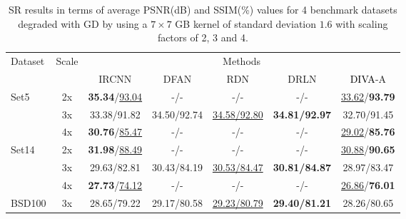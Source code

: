 \documentclass[10pt,journal,compsoc]{IEEEtran}
\newcommand\bdr[1]{{\textbf{#1}}}
\newcommand\bdb[1]{{\underline{#1}}}
\newcommand{\dk}{\textcolor{black}}
\begin{document}
\begin{table}[t!]
\setlength\tabcolsep{1.7pt}

\begin{scriptsize}
\begin{center}
\caption{SR results in terms of average PSNR(dB) and SSIM(\%) values for 4 benchmark datasets degraded with GD by using a $7 \times 7$ GB kernel of standard deviation $1.6$ with scaling factors of 2, 3 and 4.}
\label{tab:tab_psnr_ssim_GausSupReso}
\begin{tabular}{l c ccccc}
\hline

Dataset & Scale & \multicolumn{5}{c}{Methods}\\ 

& & IRCNN\cite{Zhang2017learning} & DFAN\cite{Li2022DFAN} & RDN\cite{Zhang2021residual} & DRLN\cite{Anwar2022densely} & \dk{DIVA}-A \\
\hline


\multirow{3}{*}{Set5}

& 2x & \bdr{35.34}/\bdb{93.04} & -/- & -/- & -/- & \bdb{33.62}/\bdr{93.79} \\

& 3x & 33.38/91.82 & 34.50/92.74 & \bdb{34.58/92.80} & \bdr{34.81/92.97} & 32.70/91.45\\

& 4x &  \bdr{30.76}/\bdb{85.47} & -/- & -/- & -/- & \bdb{29.02}/\bdr{85.76}\\

\hline


\multirow{3}{*}{Set14}

& 2x & \bdr{31.98}/\bdb{88.49} & -/- & -/- & -/- & \bdb{30.88}/\bdr{90.65} \\

& 3x & 29.63/82.81 & 30.43/84.19 & \bdb{30.53/84.47} & \bdr{30.81/84.87} & 28.97/83.47\\

& 4x & \bdr{27.73}/\bdb{74.12} & -/- & -/- & -/- & \bdb{26.86}/\bdr{76.01} \\

\hline


\multirow{1}{*}{BSD100}

& 3x & 28.65/79.22 & 29.17/80.58 & \bdb{29.23/80.79} & \bdr{29.40/81.21} & 28.26/80.65\\


\end{tabular}
\end{center}
\end{scriptsize}
\end{table}
\end{document}
